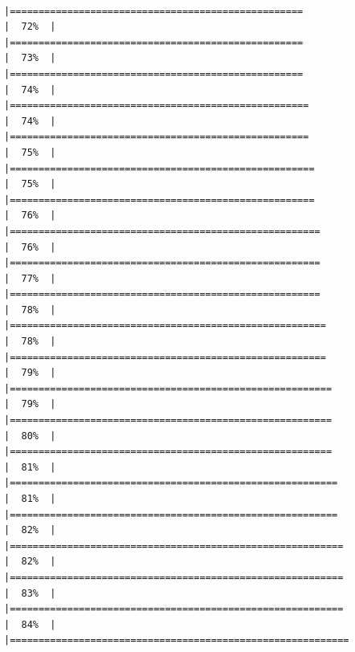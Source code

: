 \documentclass[
  ignorenonframetext,
]{beamer}
\begin{document}
\begin{frame}[fragile]{}
\begin{verbatim}
                                                                        |===================================================                   |  72%  |                                                                              |===================================================                   |  73%  |                                                                              |===================================================                   |  74%  |                                                                              |====================================================                  |  74%  |                                                                              |====================================================                  |  75%  |                                                                              |=====================================================                 |  75%  |                                                                              |=====================================================                 |  76%  |                                                                              |======================================================                |  76%  |                                                                              |======================================================                |  77%  |                                                                              |======================================================                |  78%  |                                                                              |=======================================================               |  78%  |                                                                              |=======================================================               |  79%  |                                                                              |========================================================              |  79%  |                                                                              |========================================================              |  80%  |                                                                              |========================================================              |  81%  |                                                                              |=========================================================             |  81%  |                                                                              |=========================================================             |  82%  |                                                                              |==========================================================            |  82%  |                                                                              |==========================================================            |  83%  |                                                                              |==========================================================            |  84%  |                                                                              |===========================================================  
\end{verbatim}
\end{frame}
\end{document}
